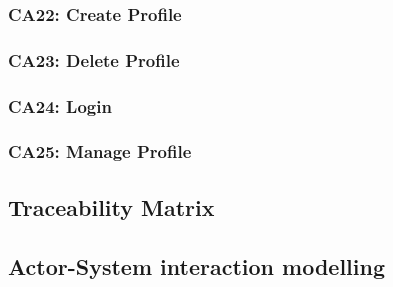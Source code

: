 \documentclass[12pt,a4paper]{article}
\begin{document}
		\subsubsection{CA22: Create Profile}
		\subsubsection{CA23: Delete Profile}
		\subsubsection{CA24: Login}
		\subsubsection{CA25: Manage Profile}
	\subsection{Traceability Matrix}
	\subsection{Actor-System interaction modelling}
\end{document}
